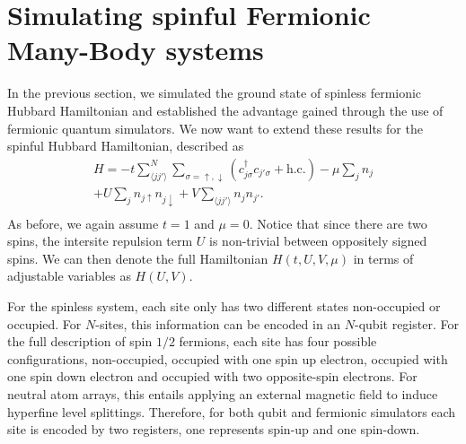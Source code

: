 \documentclass[aps, pra, reprint, superscriptaddress]{revtex4-1}
\begin{document}
\section{Simulating spinful Fermionic Many-Body systems}
\label{sec:IV}
In the previous section, we simulated the ground state of spinless fermionic Hubbard Hamiltonian and established the advantage gained through the use of fermionic quantum simulators. We now want to extend these results for the spinful Hubbard Hamiltonian, described as 
\begin{eqnarray}
    H = -t \sum_{\langle jj'\rangle}^{N}\sum_{\sigma = \uparrow, \downarrow} \left(c_{j \sigma}^{\dagger} c_{j'\sigma} + \text{h.c.} \right) -\mu \sum_{j} n_{j} \nonumber \\ + U \sum_{j} n_{j\uparrow} n_{j \downarrow} + V \sum_{\langle jj'\rangle} n_{j} n_{j'}\nonumber. \\
    \label{eq:hubbard}
\end{eqnarray}
As before, we again assume $t{=}1$ and $\mu{=}0$. Notice that since there are two spins, the intersite repulsion term $U$ is non-trivial between oppositely signed spins. We can then denote the full Hamiltonian $H(t,U,V,\mu)$ in terms of adjustable variables as $H(U,V)$. 

For the spinless system, each site only has two different states  non-occupied or occupied. For $N$-sites, this information can be encoded in an $N$-qubit register. For the full description of spin $1/2$ fermions, each site has four possible configurations, non-occupied, occupied with one spin up electron, occupied with one spin down electron and occupied with two opposite-spin  electrons. For neutral atom arrays, this entails applying an external magnetic field to induce hyperfine level splittings. Therefore, for both qubit and fermionic simulators each site is encoded by two registers, one represents spin-up and one spin-down.
\end{document}
